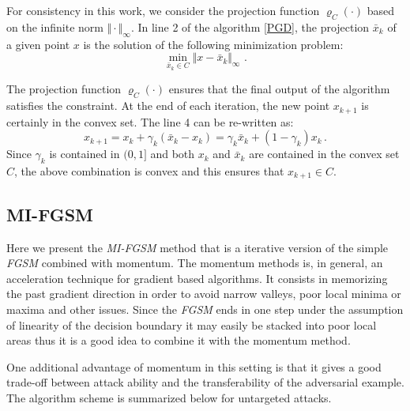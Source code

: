 \documentclass[10pt,twocolumn,letterpaper, english]{article}
\theoremstyle{definition}
\theoremstyle{plain}
\theoremstyle{plain}
\theoremstyle{plain}
\theoremstyle{plain}
\theoremstyle{remark}
\theoremstyle{remark}
\theoremstyle{definition}
\theoremstyle{definition}
\theoremstyle{definition}
\theoremstyle{definition}
\renewcommand{\rho}{\varrho}
\begin{document}
For consistency in this work, we consider the projection function $\rho_C(\cdot)$ based on the infinite norm $\Vert \cdot \Vert_\infty$. 
In line 2 of the algorithm \ref{PGD}, the projection $\bar{x}_k$ of a given point $x$ is the solution of the following minimization problem: 
\begin{equation*}
    \min_{\bar{x}_k \in C} \Vert x - \bar{x}_k \Vert_\infty \,\,.
\end{equation*}

The projection function $\rho_C(\cdot)$ ensures that the final output of the algorithm satisfies the constraint. 
At the end of each iteration, the new point $x_{k+1}$ is certainly in the convex set.
The line 4 can be re-written as: 
\begin{equation*}
    x_{k+1} = x_k + \gamma_k (\bar{x}_k - x_k) = \gamma_k \bar{x}_k + (1-\gamma_k) x_k \,.
\end{equation*}
Since $\gamma_k$ is contained in $(0,1]$ and both $x_k$ and $\bar{x}_k$ are contained in the convex set $C$, the above combination is convex and this ensures that $x_{k+1} \in C$. 

\subsection{MI-FGSM}

Here we present the \textit{MI-FGSM} method that is a iterative version of the simple \textit{FGSM} combined with momentum. The momentum methods is, in general, an acceleration technique for gradient based algorithms. It consists in memorizing the past gradient direction in order to avoid narrow valleys, poor local minima or maxima and other issues. Since the \textit{FGSM} ends in one step under the assumption of linearity of the decision boundary \cite{goodfellow} it may easily be stacked into poor local areas thus it is a good idea to combine it with the momentum method.

One additional advantage of momentum in this setting is that it gives a good trade-off between attack ability and the transferability of the adversarial example. \\



The algorithm scheme is summarized below for untargeted attacks.
\end{document}
